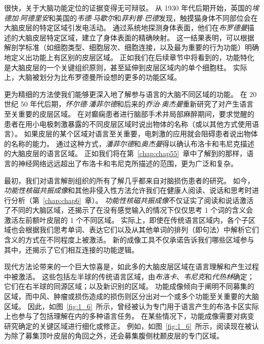很快，关于大脑功能定位的证据变得无可辩驳。
从 1930 年代后期开始，英国的\textit{埃德加$\cdot$阿德里安}和美国的\textit{韦德$\cdot$马歇尔}和\textit{菲利普$\cdot$巴德}发现，触摸猫身体不同部位会在大脑皮层的特定区域引发电活动。
通过系统地探测身体表面，他们在\textit{布罗德曼}描述的大脑皮层特定区域，建立了身体表面的精确映射。
这一结果表明，可以根据解剖学标准（如细胞类型、细胞层次、细胞连接，以及最为重要的行为功能）明确地定义出功能上有区别的皮层区域。
正如我们在后续章节中将看到的，功能特化是大脑皮层的一个关键组织原则，甚至延伸到皮层区域内的单个细胞柱。
实际上，大脑被划分为比布罗德曼所设想的更多的功能区域。



更为精细的方法使我们能够更深入地了解参与语言的大脑不同区域的功能。
在 20 世纪 50 年代后期，\textit{怀尔德$\cdot$潘菲尔德}和后来的\textit{乔治$\cdot$奥杰曼}重新研究了对产生语言至关重要的皮层区域。
在对癫痫患者进行脑部手术并局部麻醉期间，要求觉醒的患者在用小电极刺激暴露的不同皮层区域时说出物体的名称（或以其他方式使用语言）。
如果皮层的某个区域对语言至关重要，电刺激的应用就会阻碍患者说出物体的名称的能力。
通过这种方式，\textit{潘菲尔德}和\textit{奥杰曼}得以确认布洛卡和韦尼克描述的大脑皮层的语言区域。
正如我们将在第~\ref{chap:chap55}~章中了解到的那样，语言的神经网络远远超出了布洛卡和韦尼克所描述的范围，更为广泛和复杂。


最初，我们对语言解剖组织的所有了解几乎都来自对脑损伤患者的研究。
如今，\textit{功能性核磁共振成像}和其他非侵入性方法允许我们在健康人阅读、说话和思考时进行分析（第~\ref{chap:chap6}~章）。
\textit{功能性核磁共振成像}不仅证实了阅读和说话激活了不同的大脑区域，还揭示了在没有感觉输入的情况下仅仅思考 1 个词的含义会激活左前额叶皮层的 1 个不同区域。
实际上，即使在传统语言区域内，各个子区域也会根据我们思考单词、表达它们以及从其他单词的排列（即句法）中解析它们含义的方式在不同程度上被激活。
新的成像工具不仅承诺告诉我们哪些区域参与其中，还揭示了它们相互连接的功能逻辑。



现代方法论带来的一个巨大惊喜是，如此多的大脑皮层区域在语言理解和产生过程中被激活。
这些包括左半球的传统语言区域，由\textit{布洛卡}、\textit{韦尼克}和\textit{代热林}确定； 它们在右半球的同源区域；以及新识别的区域。
功能成像倾向于阐明不同募集的区域，而中风、肿瘤或损伤造成的损伤则区分出对一个或多个功能至关重要的大脑区域。
因此，如图~\ref{fig:1_6}~所示，曾经被认为专门用于语言产生的布洛卡区实际上也参与了包括理解在内的多种语言任务。
在某些情况下，功能成像需要对病变研究确定的关键区域进行细化或修正。
例如，如图~\ref{fig:1_6}~所示，阅读现在被认为除了募集顶叶皮层的角回之外，还会募集腹侧枕颞皮层的专门区域。





